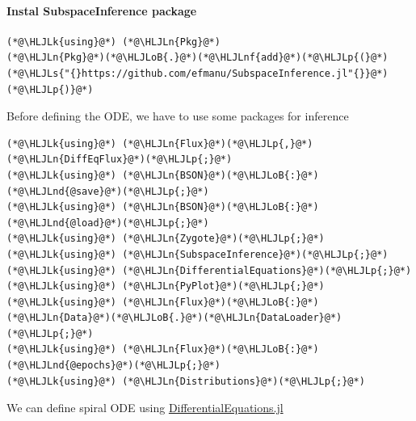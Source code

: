 \documentclass[12pt,a4paper]{article}
\newcommand{\HLJLk}[1]{\textcolor[RGB]{148,91,176}{\textbf{#1}}}
\newcommand{\HLJLn}[1]{#1}
\newcommand{\HLJLnd}[1]{\textcolor[RGB]{214,102,97}{#1}}
\newcommand{\HLJLnf}[1]{\textcolor[RGB]{66,102,213}{#1}}
\newcommand{\HLJLs}[1]{\textcolor[RGB]{201,61,57}{#1}}
\newcommand{\HLJLoB}[1]{\textcolor[RGB]{102,102,102}{\textbf{#1}}}
\newcommand{\HLJLp}[1]{#1}
\begin{document}
\paragraph{Instal SubspaceInference package}

\begin{lstlisting}
(*@\HLJLk{using}@*) (*@\HLJLn{Pkg}@*)
(*@\HLJLn{Pkg}@*)(*@\HLJLoB{.}@*)(*@\HLJLnf{add}@*)(*@\HLJLp{(}@*)(*@\HLJLs{"{}https://github.com/efmanu/SubspaceInference.jl"{}}@*)(*@\HLJLp{)}@*)
\end{lstlisting}

Before defining the ODE, we have to use some packages for inference


\begin{lstlisting}
(*@\HLJLk{using}@*) (*@\HLJLn{Flux}@*)(*@\HLJLp{,}@*) (*@\HLJLn{DiffEqFlux}@*)(*@\HLJLp{;}@*)
(*@\HLJLk{using}@*) (*@\HLJLn{BSON}@*)(*@\HLJLoB{:}@*) (*@\HLJLnd{@save}@*)(*@\HLJLp{;}@*)
(*@\HLJLk{using}@*) (*@\HLJLn{BSON}@*)(*@\HLJLoB{:}@*) (*@\HLJLnd{@load}@*)(*@\HLJLp{;}@*)
(*@\HLJLk{using}@*) (*@\HLJLn{Zygote}@*)(*@\HLJLp{;}@*)
(*@\HLJLk{using}@*) (*@\HLJLn{SubspaceInference}@*)(*@\HLJLp{;}@*)
(*@\HLJLk{using}@*) (*@\HLJLn{DifferentialEquations}@*)(*@\HLJLp{;}@*)
(*@\HLJLk{using}@*) (*@\HLJLn{PyPlot}@*)(*@\HLJLp{;}@*)
(*@\HLJLk{using}@*) (*@\HLJLn{Flux}@*)(*@\HLJLoB{:}@*) (*@\HLJLn{Data}@*)(*@\HLJLoB{.}@*)(*@\HLJLn{DataLoader}@*)(*@\HLJLp{;}@*)
(*@\HLJLk{using}@*) (*@\HLJLn{Flux}@*)(*@\HLJLoB{:}@*) (*@\HLJLnd{@epochs}@*)(*@\HLJLp{;}@*)
(*@\HLJLk{using}@*) (*@\HLJLn{Distributions}@*)(*@\HLJLp{;}@*)
\end{lstlisting}

We can define spiral ODE using \href{https://github.com/SciML/DifferentialEquations.jl}{DifferentialEquations.jl}
\end{document}
